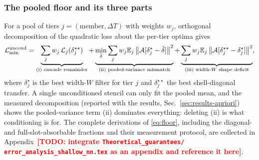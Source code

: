\documentclass[11pt]{article}
\theoremstyle{plain}
\theoremstyle{definition}
\newcommand{\TODO}[1]{\textcolor{red}{\textbf{[TODO: #1]}}}
\newcommand{\DT}{\Delta T}
\newcommand{\norm}[1]{\left\lVert #1 \right\rVert}
\newcommand{\E}{\mathbb{E}}
\begin{document}
\subsubsection{The pooled floor and its three parts}
For a pool of tiers $j=(\text{member},\DT)$ with weights $w_j$, orthogonal
decomposition of the quadratic loss about the per-tier optima gives
\begin{equation}
\mathcal L^{\rm uncond}_{\min}
=\underbrace{\sum_jw_j\,\mathcal L_j(\delta^{\star\star}_j)}
  _{\text{(i) cascade remainder}}
+\underbrace{\min_{\bar\delta}\sum_jw_j\E_j
  \norm{\mathcal A[\delta^\star_j-\bar\delta]}^2}
  _{\text{(ii) pooled-variance mismatch}}
+\underbrace{\sum_jw_j\E_j
  \norm{\mathcal A[\delta^{\star\star}_j-\delta^\star_j]}^2}
  _{\text{(iii) width-}W\text{ shape deficit}},
\label{eq:floor}
\end{equation}
where $\delta^\star_j$ is the best width-$W$ filter for tier $j$ and
$\delta^{\star\star}_j$ the best shell-diagonal transfer. A single
unconditioned stencil can only fit the pooled mean, and the measured
decomposition (reported with the results, Sec.~\ref{sec:results-apriori})
shows the pooled-variance term (ii) dominates everything: deleting (ii) is
what conditioning is for. The complete derivations of
\eqref{eq:floor}, including the diagonal- and full-slot-absorbable fractions
and their measurement protocol, are collected in
Appendix~\TODO{integrate \texttt{Theoretical\_guarantees/%
error\_analysis\_shallow\_nn.tex} as an appendix and reference it here}.
\end{document}
